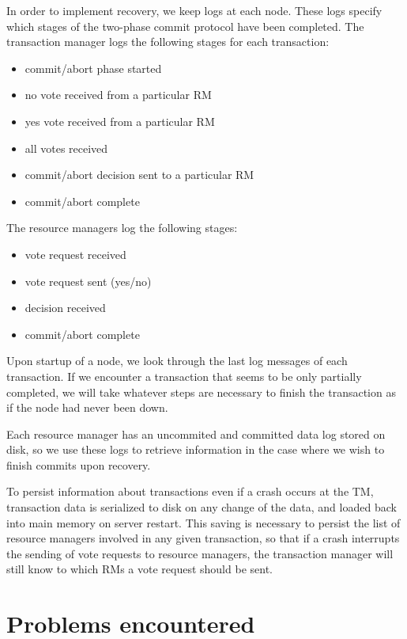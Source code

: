 \documentclass[11pt]{article}
\begin{document}
In order to implement recovery, we keep logs at each node. These logs specify which stages of the two-phase commit protocol have been completed. The transaction manager logs the following stages for each transaction:
\begin{itemize}
\item commit/abort phase started
\item no vote received from a particular RM
\item yes vote received from a particular RM
\item all votes received
\item commit/abort decision sent to a particular RM
\item commit/abort complete
\end{itemize}
The resource managers log the following stages:
\begin{itemize}
\item vote request received
\item vote request sent (yes/no)
\item decision received
\item commit/abort complete
\end{itemize} 
Upon startup of a node, we look through the last log messages of each transaction. If we encounter a transaction that seems to be only partially completed, we will take whatever steps are necessary to finish the transaction as if the node had never been down.\par 

Each resource manager has an uncommited and committed data log stored on disk, so we use these logs to retrieve information in the case where we wish to finish commits upon recovery.\par

To persist information about transactions even if a crash occurs at the TM, transaction data is serialized to disk on any change of the data, and loaded back into main memory on server restart. This saving is necessary to persist the list of resource managers involved in any given transaction, so that if a crash interrupts the sending of vote requests to resource managers, the transaction manager will still know to which RMs a vote request should be sent.

\section*{Problems encountered}
\end{document}
